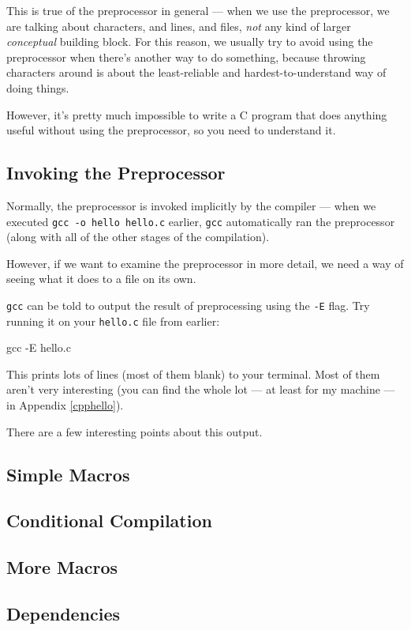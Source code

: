 \documentclass[a4paper,10pt]{report}
\newcommand{\kw}[1]{\texttt{#1}}
\begin{document}
This is true of the preprocessor in general --- when we use the
preprocessor, we are talking about characters, and lines, and files,
\emph{not} any kind of larger \emph{conceptual} building block. For
this reason, we usually try to avoid using the preprocessor when
there's another way to do something, because throwing characters
around is about the least-reliable and hardest-to-understand way of
doing things.

However, it's pretty much impossible to write a C program that does
anything useful without using the preprocessor, so you need to
understand it.

\subsection{Invoking the Preprocessor}

Normally, the preprocessor is invoked implicitly by the compiler ---
when we executed \verb!gcc -o hello hello.c! earlier, \kw{gcc}
automatically ran the preprocessor (along with all of the other stages
of the compilation).

However, if we want to examine the preprocessor in more detail, we
need a way of seeing what it does to a file on its own.

\kw{gcc} can be told to output the result of preprocessing using the
\kw{-E} flag. Try running it on your \kw{hello.c} file from earlier:

\bash[script]
gcc -E hello.c
\END

This prints lots of lines (most of them blank) to your terminal. Most
of them aren't very interesting (you can find the whole lot --- at
least for my machine --- in Appendix \ref{cpphello}).

There are a few interesting points about this output. 

\subsection{Simple Macros}

\subsection{Conditional Compilation}

\subsection{More Macros}

\subsection{Dependencies}
\end{document}
